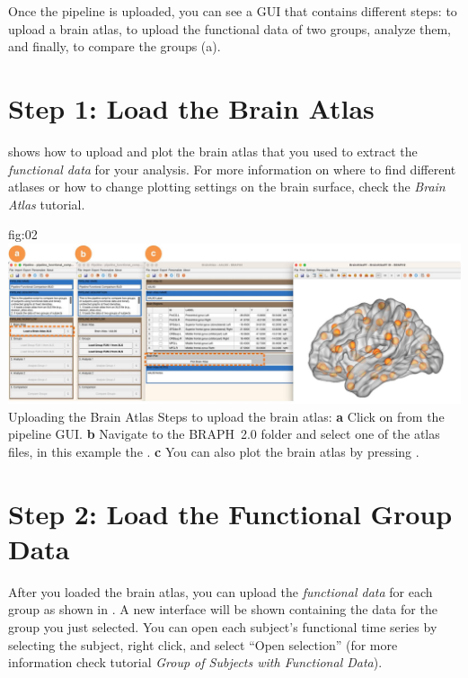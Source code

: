 \documentclass[justified]{tufte-handout}
\begin{document}
Once the pipeline is uploaded, you can see a GUI that contains different steps: to upload a brain atlas, to upload the functional data of two groups, analyze them, and finally, to compare the groups (a). 

\section{Step 1: Load the Brain Atlas}
 shows how to upload and plot the brain atlas that you used to extract the \emph{functional data} for your analysis. For more information on where to find different atlases or how to change plotting settings on the brain surface, check the \emph{Brain Atlas} tutorial.

	{fig:02}
	{
	\includegraphics{fig02.jpg}
	}
	{Uploading the Brain Atlas}
	{
	Steps to upload the brain atlas:
	{\bf a} Click on  from the pipeline GUI.
	{\bf b} Navigate to the BRAPH~2.0 folder  and select one of the atlas files, in this example the . {\bf c} You can also plot the brain atlas by pressing . 
	}
 
\section{Step 2: Load the Functional Group Data}

After you loaded the brain atlas, you can upload the \emph{functional data} for each group as shown in . A new interface will be shown containing the data for the group you just selected. You can open each subject’s functional time series by selecting the subject, right click, and select “Open selection” (for more information check tutorial \emph{Group of Subjects with Functional Data}).
	
\end{document}
